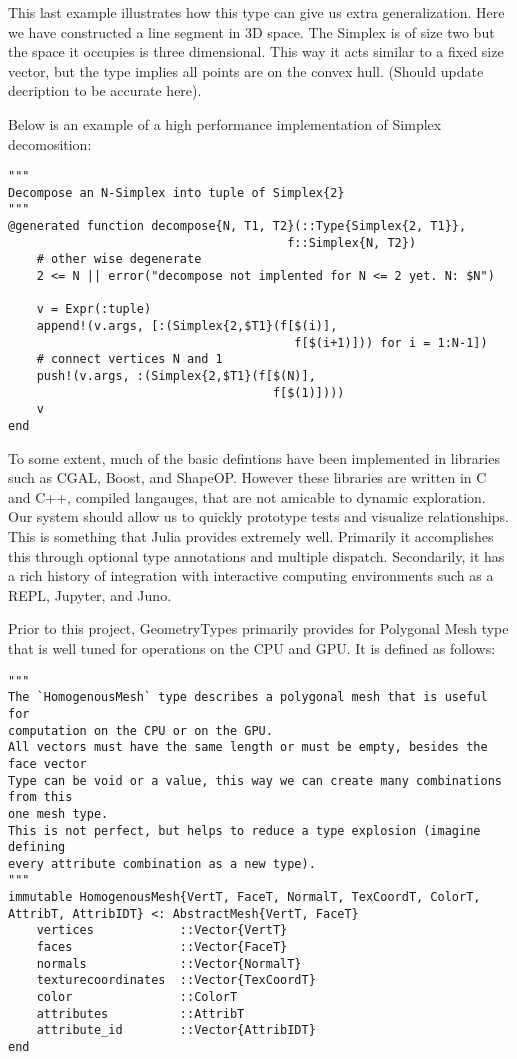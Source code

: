 This last example illustrates how this type can give us extra generalization.
Here we have constructed a line segment in 3D space. The Simplex is of
size two but the space it occupies is three dimensional. This way it acts
similar to a fixed size vector, but the type implies all points are on the
convex hull. (Should update decription to be accurate here).

Below is an example of a high performance implementation of Simplex decomosition:

\begin{lstlisting}
"""
Decompose an N-Simplex into tuple of Simplex{2}
"""
@generated function decompose{N, T1, T2}(::Type{Simplex{2, T1}},
                                       f::Simplex{N, T2})
    # other wise degenerate
    2 <= N || error("decompose not implented for N <= 2 yet. N: $N")

    v = Expr(:tuple)
    append!(v.args, [:(Simplex{2,$T1}(f[$(i)],
                                        f[$(i+1)])) for i = 1:N-1])
    # connect vertices N and 1
    push!(v.args, :(Simplex{2,$T1}(f[$(N)],
                                     f[$(1)])))
    v
end
\end{lstlisting}




To some extent, much of the basic defintions have been implemented
in libraries such as CGAL, Boost, and ShapeOP. However these libraries
are written in C and C++, compiled langauges, that are not amicable to dynamic
exploration. Our system should allow us to quickly prototype tests and
visualize relationships. This is something that Julia provides extremely well.
Primarily it accomplishes this through optional type annotations and
multiple dispatch. Secondarily, it has a rich history of integration with
interactive computing environments such as a REPL, Jupyter, and Juno.


Prior to this project, GeometryTypes primarily provides for Polygonal Mesh
type that is well tuned for operations on the CPU and GPU. It is defined
as follows:

\begin{lstlisting}
"""
The `HomogenousMesh` type describes a polygonal mesh that is useful for
computation on the CPU or on the GPU.
All vectors must have the same length or must be empty, besides the face vector
Type can be void or a value, this way we can create many combinations from this
one mesh type.
This is not perfect, but helps to reduce a type explosion (imagine defining
every attribute combination as a new type).
"""
immutable HomogenousMesh{VertT, FaceT, NormalT, TexCoordT, ColorT, AttribT, AttribIDT} <: AbstractMesh{VertT, FaceT}
    vertices            ::Vector{VertT}
    faces               ::Vector{FaceT}
    normals             ::Vector{NormalT}
    texturecoordinates  ::Vector{TexCoordT}
    color               ::ColorT
    attributes          ::AttribT
    attribute_id        ::Vector{AttribIDT}
end
\end{lstlisting}

